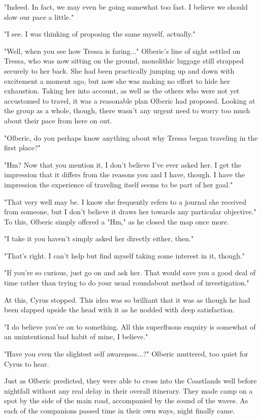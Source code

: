 "Indeed. In fact, we may even be going somewhat too fast. I believe we should slow our pace a little."

"I see. I was thinking of proposing the same myself, actually."

"Well, when you see how Tressa is faring..." Olberic's line of sight settled on Tressa, who was now sitting on the ground, monolithic luggage still strapped securely to her back. She had been practically jumping up and down with excitement a moment ago, but now she was making no effort to hide her exhaustion. Taking her into account, as well as the others who were not yet accustomed to travel, it was a reasonable plan Olberic had proposed. Looking at the group as a whole, though, there wasn't any urgent need to worry too much about their pace from here on out.

"Olberic, do you perhaps know anything about why Tressa began traveling in the first place?"

"Hm? Now that you mention it, I don't believe I've ever asked her. I get the impression that it differs from the reasons you and I have, though. I have the impression the experience of traveling itself seems to be part of her goal."

"That very well may be. I know she frequently refers to a journal she received from someone, but I don't believe it draws her towards any particular objective." To this, Olberic simply offered a "Hm," as he closed the map once more.	

"I take it you haven't simply asked her directly either, then."

"That's right. I can't help but find myself taking some interest in it, though."

"If you're so curious, just go on and ask her. That would save you a good deal of time rather than trying to do your usual roundabout method of investigation."

At this, Cyrus stopped. This idea was so brilliant that it was as though he had been slapped upside the head with it as he nodded with deep satisfaction.

"I do believe you're on to something. All this superfluous enquiry is somewhat of an unintentional bad habit of mine, I believe."

"Have you even the slightest self awareness...?" Olberic muttered, too quiet for Cyrus to hear.
\newline

Just as Olberic predicted, they were able to cross into the Coastlands well before nightfall without any real delay in their overall itinerary. They made camp on a spot by the side of the main road, accompanied by the sound of the waves. As each of the companions passed time in their own ways, night finally came.

